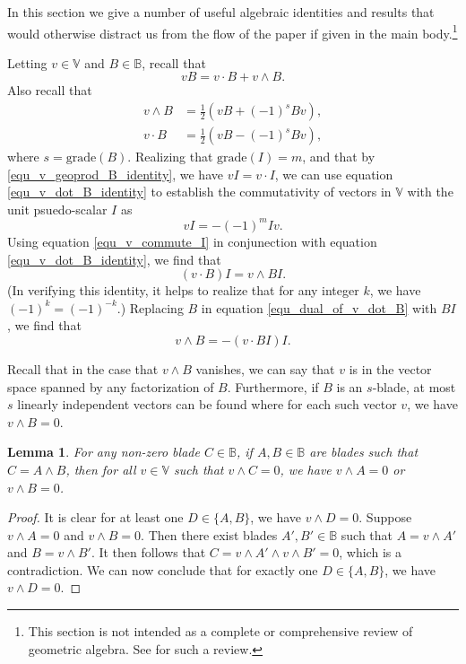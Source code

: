 \documentclass{birkjour}
\newtheorem{lem}[thm]{Lemma}
\theoremstyle{definition}
\theoremstyle{remark}
\numberwithin{equation}{section}
\newcommand{\B}{\mathbb{B}}
\newcommand{\V}{\mathbb{V}}
\newcommand{\grade}{\mbox{grade}}
\begin{document}
In this section we give a number of useful algebraic identities and results that would otherwise distract us from the flow of the
paper if given in the main body.\footnote{This section is not intended as a complete or comprehensive review of geometric algebra.
See \cite{} for such a review.}

Letting $v\in\V$ and $B\in\B$, recall that
\begin{equation}\label{equ_v_geoprod_B_identity}
vB = v\cdot B+v\wedge B.
\end{equation}
Also recall that
\begin{align}
v\wedge B &= \frac{1}{2}(vB+(-1)^sBv),\label{equ_v_wedge_B_identity} \\
v\cdot B &= \frac{1}{2}(vB-(-1)^sBv),\label{equ_v_dot_B_identity}
\end{align}
where $s=\grade(B)$.
Realizing that $\grade(I)=m$, and that by \eqref{equ_v_geoprod_B_identity}, we have $vI=v\cdot I$, we can use
equation \eqref{equ_v_dot_B_identity} to establish the commutativity of vectors in $\V$ with the unit psuedo-scalar $I$ as
\begin{equation}\label{equ_v_commute_I}
vI = -(-1)^mIv.
\end{equation}
Using equation \eqref{equ_v_commute_I} in conjunection with equation \eqref{equ_v_dot_B_identity}, we find that
\begin{equation}\label{equ_dual_of_v_dot_B}
(v\cdot B)I = v\wedge BI.
\end{equation}
(In verifying this identity, it helps to realize that for any integer $k$, we have $(-1)^k=(-1)^{-k}$.)
Replacing $B$ in equation \eqref{equ_dual_of_v_dot_B} with $BI$, we find that
\begin{equation}\label{equ_dual_of_v_dot_dual_B}
v\wedge B = -(v\cdot BI)I.
\end{equation}

Recall that in the case that $v\wedge B$ vanishes, we can say that $v$ is
in the vector space spanned by any factorization of $B$.  Furthermore,
if $B$ is an $s$-blade, at most $s$ linearly independent vectors can be
found where for each such vector $v$, we have $v\wedge B=0$.

\begin{lem}
For any non-zero blade $C\in\B$, if $A,B\in\B$ are blades such that
$C=A\wedge B$, then for all $v\in\V$ such that $v\wedge C=0$, we have
$v\wedge A=0$ or $v\wedge B=0$.
\end{lem}
\begin{proof}
It is clear for at least one $D\in\{A,B\}$, we have $v\wedge D=0$.
Suppose $v\wedge A=0$ and $v\wedge B=0$.  Then there exist blades $A',B'\in\B$
such that $A=v\wedge A'$ and $B=v\wedge B'$.  It then follows that
$C=v\wedge A'\wedge v\wedge B'=0$, which is a contradiction.
We can now conclude that for exactly one $D\in\{A,B\}$, we have $v\wedge D=0$.
\end{proof}
\end{document}
